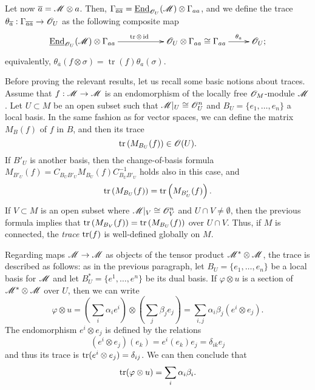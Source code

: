 Let now $\overline{a}=\mathscr{M}\otimes a$. Then, $\Gamma_{\overline{a}\overline{a}}=\underline{\operatorname{End}}_{\mathscr{O}_U}(\mathscr{M})\otimes \Gamma_{aa}$, and we define the trace $\theta_{\overline{a}}:\Gamma_{\overline{a}\overline{a}}\to \mathscr{O}_U$ as the following composite map
$$
\xymatrix{
\underline{\operatorname{End}}_{\scr{O}_U}(\scr{M})\otimes \Gamma_{aa} \ar[rr]^{\operatorname{tr}\otimes \operatorname{id}} & & \scr{O}_U\otimes \Gamma_{aa}\cong \Gamma_{aa} \ar[r]^-{\theta_a} & \scr{O}_U;}
$$
equivalently, $\theta_{\overline{a}}(f\otimes \sigma )=\operatorname{tr}(f)\theta_a(\sigma )$.

Before proving the relevant results, let us recall some basic notions about traces. Assume that $f:\mathscr{M}\to \mathscr{M}$ is an endomorphism of the locally free $\mathscr{O}_M$-module $\mathscr{M}$. Let $U\subset M$ be an open subset such that $\mathscr{M}|_U\cong \mathscr{O}_U^n$ and $B_U=\{e_1,\dots ,e_n\}$ a local basis. In the same fashion as for vector spaces, we can define the matrix $M_B(f)$ of $f$ in $B$, and then its trace
$$\operatorname{tr}\left (M_{B_U}(f)\right )\in \mathscr{O}(U).$$
If $B'_U$ is another basis, then the change-of-basis formula $M_{B'_U}(f)=C_{B_UB'_U}M_{B_U}(f)C_{B_UB'_U}^{-1}$ holds also in this case, and
$$\operatorname{tr}\left (M_{B_U}(f)\right )=\operatorname{tr}\left (M_{B'_U}(f)\right ).$$
If $V\subset M$ is an open subset where $\mathscr{M}|_V\cong \mathscr{O}_V^n$ and $U\cap V\neq \emptyset$, then the previous formula implies that $\operatorname{tr}\left (M_{B_V}(f)\right )=\operatorname{tr}\left (M_{B_U}(f)\right )$ over $U\cap V$. Thus, if $M$ is connected, the \emph{trace} $\operatorname{tr}(f)$ is well-defined globally on $M$.

Regarding maps $\mathscr{M}\to \mathscr{M}$ as objects of the tensor product $\mathscr{M}^*\otimes \mathscr{M}$, the trace is described as follows: as in the previous paragraph, let $B_U=\{e_1,\dots ,e_n\}$ be a local basis for $\mathscr{M}$ and let $B_U^*=\{e^1,\dots ,e^n\}$ be its dual basis. If $\varphi \otimes u $ is a section of $\mathscr{M}^*\otimes \mathscr{M}$ over $U$, then we can write
$$\varphi \otimes u =\left (\sum_i \alpha_ie^i\right )\otimes \left (\sum_j\beta_je_j\right )=\sum_{i,j}\alpha_i\beta_j(e^i\otimes e_j).$$
The endomorphism $e^i\otimes e_j$ is defined by the relations
$$\left (e^i\otimes e_j\right )(e_k)=e^i(e_k)e_j=\delta_{ik}e_j$$ 
and thus its trace is $\operatorname{tr}(e^i\otimes e_j)=\delta_{ij}$. We can then conclude that
$$\operatorname{tr}(\varphi \otimes u)=\sum_i\alpha_i\beta_i.$$

